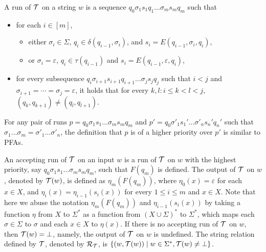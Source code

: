 A run of $\mathcal{T}$ on a string $w$ is a sequence $q_0 \sigma_1 s_1 q_1 \ldots \sigma_m s_m q_m$ such that
\begin{itemize}
%
\item for each $i \in [m]$, 
\begin{itemize}
\item either $\sigma_i \in \Sigma$, $q_i \in \delta (q_{i-1}, \sigma_i)$, and $s_i = E (q_{i - 1}, \sigma_i, q_i)$, 
\item or $\sigma_i = \varepsilon$, $q_i \in \tau(q_{i-1})$ and $s_i = E (q_{i - 1}, \varepsilon, q_i)$,
\end{itemize}

\item for every subsequence $q_i \sigma_{i+1} s_{i+1} q_{i+1} \ldots \sigma_{j} s_j q_j$ such that  $i < j$ and $\sigma_{i+1} = \cdots = \sigma_j = \varepsilon$,  it holds that for every $k, l: i \le k < l < j$, $(q_k, q_{k+1}) \neq (q_l, q_{l+1})$.
\end{itemize}

For any pair of runs $p = q_0 \sigma_1 s_1 \ldots \sigma_m s_m q_m$ and $p' = q_0 \sigma'_1
  s_1' \ldots \sigma'_n s_n' q_n'$ such that $\sigma_1 \ldots \sigma_m = \sigma'_1 \ldots \sigma'_n$, the definition that $p$ is of a higher priority over
  $p'$ is similar to PFAs.
  
An accepting run of $\mathcal{T}$ on an input $w$ is a run of $\mathcal{T}$ on $w$ with the highest priority, say $q_0 \sigma_1 s_1 \ldots \sigma_m s_m q_m$, such that $F(q_m)$ is defined. The output of $\mathcal{T}$ on $w$, denoted by $\mathcal{T}(w)$, is defined as $\eta_m(F(q_m))$, where $\eta_0(x) = \varepsilon$ for each $x \in X$, and $\eta_{i}(x) = \eta_{i-1}(s_{i}(x))$ for every $1 \le i \le m$ and $x \in X$. Note that here we abuse the notation  $\eta_m(F(q_m))$ and $\eta_{i-1}(s_{i}(x))$ by taking a function $\eta$ from $X$ to $\Sigma^*$ as a function from $(X \cup \Sigma)^*$ to $\Sigma^*$, which maps each $\sigma \in \Sigma$ to $\sigma$ and each $x \in X$ to $\eta(x)$. If there is no accepting run of $\mathcal{T}$ on $w$, then $\mathcal{T}(w) = \bot$, namely, the output of $\mathcal{T}$ on $w$ is undefined. The string relation defined by $\mathcal{T}$, denoted by $\mathcal{R}_{\mathcal{T}}$,  is $\{(w, \mathcal{T}(w)) \mid w \in \Sigma^\ast, \mathcal{T}(w) \neq \bot\}$.

